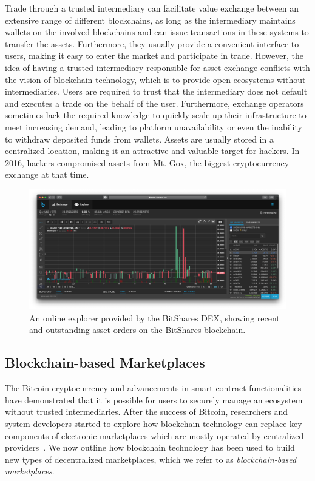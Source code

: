 Trade through a trusted intermediary can facilitate value exchange between an extensive range of different blockchains, as long as the intermediary maintains wallets on the involved blockchains and can issue transactions in these systems to transfer the assets.
Furthermore, they usually provide a convenient interface to users, making it easy to enter the market and participate in trade.
However, the idea of having a trusted intermediary responsible for asset exchange conflicts with the vision of blockchain technology, which is to provide open ecosystems without intermediaries.
Users are required to trust that the intermediary does not default and executes a trade on the behalf of the user.
Furthermore, exchange operators sometimes lack the required knowledge to quickly scale up their infrastructure to meet increasing demand, leading to platform unavailability or even the inability to withdraw deposited funds from wallets.
Assets are usually stored in a centralized location, making it an attractive and valuable target for hackers.
In 2016, hackers compromised assets from Mt. Gox, the biggest cryptocurrency exchange at that time.

\begin{figure}[t]
	\centering
	\includegraphics[width=\linewidth]{introduction/assets/bitshares}
	\caption{An online explorer provided by the BitShares DEX, showing recent and outstanding asset orders on the BitShares blockchain.}
	\label{fig:bitshares_explorer}
\end{figure}

\subsection{Blockchain-based Marketplaces}
The Bitcoin cryptocurrency and advancements in smart contract functionalities have demonstrated that it is possible for users to securely manage an ecosystem without trusted intermediaries.
After the success of Bitcoin, researchers and system developers started to explore how blockchain technology can replace key components of electronic marketplaces which are mostly operated by centralized providers~\cite{subramanian2017decentralized}.
We now outline how blockchain technology has been used to build new types of decentralized marketplaces, which we refer to as \emph{blockchain-based marketplaces}.

